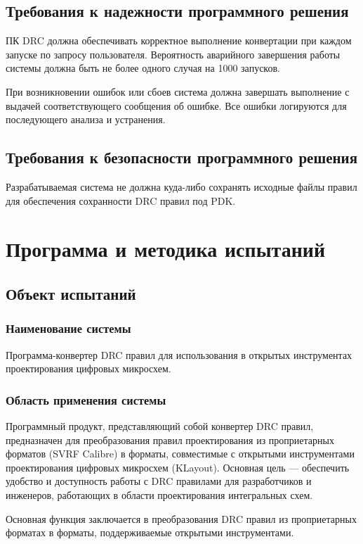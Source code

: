 \subsection{Требования к надежности программного решения}

ПК DRC должна обеспечивать корректное выполнение конвертации
при каждом запуске по запросу пользователя.
Вероятность аварийного завершения работы системы должна быть
не более одного случая на 1000 запусков.

При возникновении ошибок или сбоев система должна завершать выполнение
с выдачей соответствующего сообщения об ошибке.
Все ошибки логируются для последующего анализа и устранения.

\subsection{Требования к безопасности программного решения}

Разрабатываемая система не должна куда-либо сохранять исходные файлы правил
для обеспечения сохранности DRC правил под PDK.

\section{Программа и методика испытаний}

\subsection{Объект испытаний}

\subsubsection{Наименование системы}

Программа-конвертер DRC правил для использования
в открытых инструментах проектирования цифровых микросхем.

\subsubsection{Область применения системы}

Программный продукт, представляющий собой конвертер DRC правил,
предназначен для преобразования правил проектирования
из проприетарных форматов (SVRF Calibre) в форматы, совместимые
с открытыми инструментами проектирования цифровых микросхем (KLayout).
Основная цель --- обеспечить удобство
и доступность работы с DRC правилами для разработчиков и инженеров,
работающих в области проектирования интегральных схем.\par
Основная функция заключается в преобразования DRC правил
из проприетарных форматах в форматы,
поддерживаемые открытыми инструментами.

